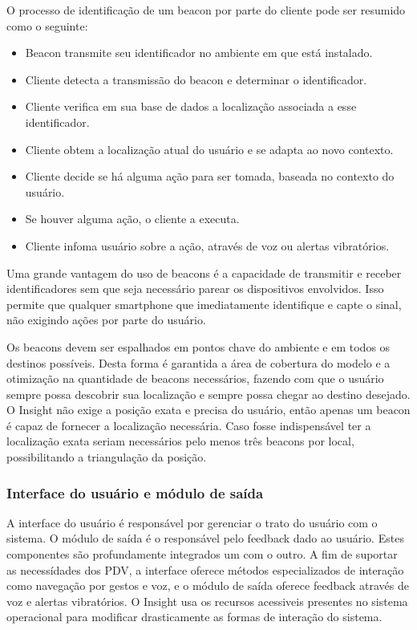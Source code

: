 \documentclass[english,brazilian]{UNISINOSmonografia}
\begin{document}
O processo de identificação de um beacon por parte do cliente pode ser resumido como o seguinte:
\begin{itemize}
	\item Beacon transmite seu identificador no ambiente em que está instalado. 
	\item Cliente detecta a transmissão do beacon e determinar o identificador.
	\item Cliente verifica em sua base de dados a localização associada a esse identificador.
	\item Cliente obtem a localização atual do usuário e se adapta ao novo contexto.
	\item Cliente decide se há alguma ação para ser tomada, baseada no contexto do usuário.
	\item Se houver alguma ação, o cliente a executa.
	\item Cliente infoma usuário sobre a ação, através de voz ou alertas vibratórios.
\end{itemize}

Uma grande vantagem do uso de beacons é a capacidade de transmitir e receber identificadores sem que seja necessário parear os dispositivos envolvidos. Isso permite que qualquer smartphone que imediatamente identifique e capte o sinal, não exigindo ações por parte do usuário.

Os beacons devem ser espalhados em pontos chave do ambiente e em todos os destinos possíveis. Desta forma é garantida a área de cobertura do modelo e a otimização na quantidade de beacons necessários, fazendo com que o usuário sempre possa descobrir sua localização e sempre possa chegar ao destino desejado. O Insight não exige a posição exata e precisa do usuário, então apenas um beacon é capaz de fornecer a localização necessária. Caso fosse indispensável ter a localização exata seriam necessários pelo menos três beacons por local, possibilitando a triangulação da posição.

	\subsubsection{Interface do usuário e módulo de saída}
A interface do usuário é responsável por gerenciar o trato do usuário com o sistema. O módulo de saída é o responsável pelo feedback dado ao usuário. Estes componentes são profundamente integrados um com o outro. A fim de suportar as necessídades dos PDV, a interface oferece métodos especializados de interação como navegação por gestos e voz, e o módulo de saída oferece feedback através de voz e alertas vibratórios. 
O Insight usa os recursos acessiveis presentes no sistema operacional para modificar drasticamente as formas de interação do sistema. 
\end{document}
